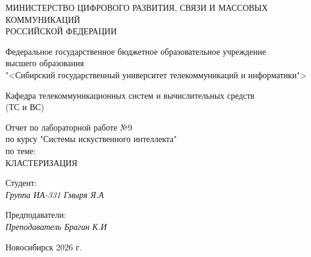 \thispagestyle{empty}

\begin{center}
    МИНИСТЕРСТВО ЦИФРОВОГО РАЗВИТИЯ, СВЯЗИ И МАССОВЫХ КОММУНИКАЦИЙ \\ РОССИЙСКОЙ ФЕДЕРАЦИИ

    \vspace{20pt}

    Федеральное государственное бюджетное образовательное учреждение  \\  высшего образования \\
    "<Сибирский государственный университет телекоммуникаций и информатики"> \\

    \vspace{20pt}

    Кафедра телекоммуникационных систем и вычислительных средств \\  (ТС и ВС)
\end{center}

\vfill

\begin{center}
    Отчет по лабораторной работе №9 \\  
    по курсу "Системы искуственного интеллекта" \\
    \vspace{20pt}
    по теме: \\
    \uppercase{ КЛАСТЕРИЗАЦИЯ}
\end{center}

\vfill

    \noindent Студент: \\
    \textit{Группа ИА-331 \hfill Гмыря Я.А} 

    \vspace{20pt}
 
    \noindent Предподаватели: \\
    \textit{Преподаватель \hfill Брагин К.И} \\
\vfill

\begin{center}
    Новосибирск 2026 г.
\end{center}
